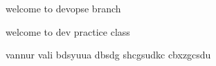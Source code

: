 
welcome to devopse branch 





welcome to dev practice class





vannur vali bdsyuua dbsdg shcgsudkc cbxzgcsdu 
